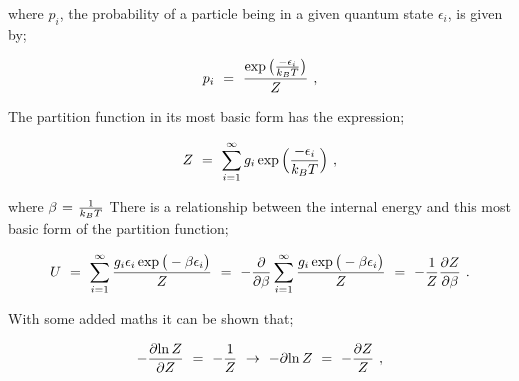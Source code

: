 \documentclass{article}
\begin{document}
where \begin{math} p_i \end{math}, the probability of a particle being in a given quantum state \begin{math} \epsilon_{i} \end{math}, is given by;

\begin{equation} \label{eb-eq-1-211}
p_i \hspace{0.125cm} = \hspace{0.125cm} \frac{\exp \big(\frac{- \epsilon_i}{k_B T}\big)}{Z}  \hspace{0.125cm} ,
\end{equation}

The partition function in its most basic form has the expression;

\begin{equation} \label{eb-eq-1-212}
Z \hspace{0.125cm} = \hspace{0.125cm} \sum_{i = 1}^{\infty} g_i \exp \Big(\frac{- \epsilon_i}{k_B T}\Big) \hspace{0.125cm} ,
\end{equation}

where \begin{math} \beta \hspace{0.025cm} = \hspace{0.025cm} \frac{1}{k_B T} \end{math} There is a relationship between the internal energy and this most basic form of the partition function;

\begin{equation} \label{eb-eq-1-213}
U \hspace{0.125cm} = \hspace{0.125cm} \sum_{i = 1}^{\infty} \frac{g_i \epsilon_{i} \exp \big(- \beta \epsilon_i \big)}{Z} \hspace{0.125cm} = \hspace{0.125cm} - \frac{\partial}{\partial{\beta}}\sum_{i = 1}^{\infty} \frac{g_i \exp \big(- \beta \epsilon_i \big)}{Z} \hspace{0.125cm} = \hspace{0.125cm} - \frac{1}{Z} \frac{\partial Z}{\partial{\beta}}   \hspace{0.125cm} .
\end{equation}

With some added maths it can be shown that;

\begin{equation} \label{eb-eq-1-214}
- \frac{\partial{\ln{Z}}}{\partial{Z}} \hspace{0.125cm} = \hspace{0.125cm} - \frac{1}{Z} \hspace{0.125cm} \rightarrow \hspace{0.125cm} - \partial{\ln{Z}} \hspace{0.125cm} = \hspace{0.125cm} - \frac{\partial{Z}}{Z} \hspace{0.125cm}, 
\end{equation}
\end{document}
